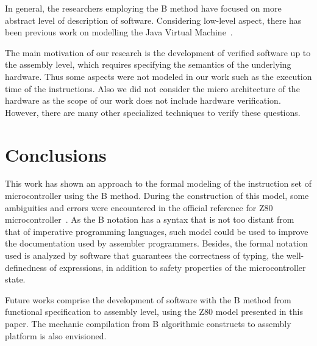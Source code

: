 \documentclass[11pt]{article} %
\begin{document}


In general, the researchers employing the B method have focused on
more abstract level of description of software.  Considering low-level
aspect, there has been previous work on modelling the Java Virtual
Machine~\cite{GEMPLUS_99}.

The main motivation of our research is the development of verified
software up to the assembly level, which requires specifying the
semantics of the underlying hardware. Thus some aspects were not
modeled in our work such as the execution time of the instructions.
Also we did not consider the micro architecture of the hardware as the scope of
our work does not include hardware verification. However, there are
many other specialized techniques to verify these questions.
 
\section{Conclusions}
\label{sec:conclusions} 

This work has shown an approach to the formal modeling of the instruction set of
microcontroller using the B method. During the construction of this model, some
ambiguities and errors were encountered in the official reference for Z80
microcontroller~\cite{Z80_manual}. As the B notation has a syntax that is not too
distant from that of imperative programming languages, such model could be used
to improve the documentation used by assembler programmers. Besides, the formal
notation used is analyzed by software that guarantees the correctness of typing,
the well-definedness of expressions, in addition to safety properties of the
microcontroller state.




Future works comprise the development of software with the B method
from functional specification to assembly level, using the Z80 model
presented in this paper. The mechanic compilation from B algorithmic 
constructs to assembly platform is also envisioned.
\end{document}
